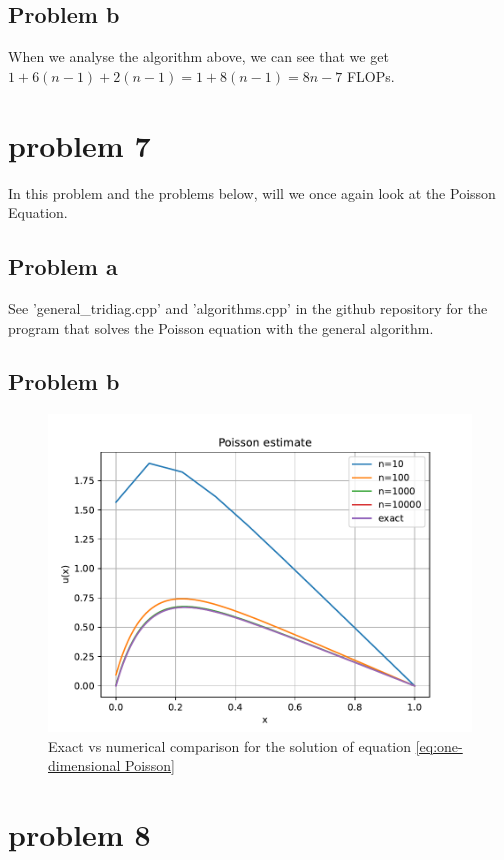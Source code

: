 \documentclass[english,notitlepage]{revtex4-1}  %
\begin{document}
\subsection*{Problem b}
When we analyse the algorithm above, we can see that we get $1 + 6(n-1) + 2(n-1) = 1 + 8(n-1) = 8n - 7$ FLOPs.


\section*{problem 7}
In this problem and the problems below, will we once again look at the Poisson Equation.

\subsection*{Problem a}
See 'general\_tridiag.cpp' and 'algorithms.cpp' in the github repository for the program that solves the Poisson equation with the general algorithm.

\subsection*{Problem b}
	\begin{figure}[H]
	\centering
	\includegraphics[scale=0.55]{plots/gen_tri_cmp_exact.pdf} %
	\caption{Exact vs numerical comparison for the solution of equation \ref{eq:one-dimensional Poisson}}
	\label{fig:Exact vs approx Poisson }
	\end{figure}


\section*{problem 8}
\end{document}
